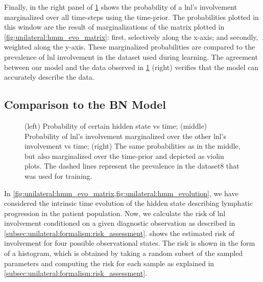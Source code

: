 \documentclass[\relativeRoot/main.tex]{subfiles}
\begin{document}
Finally, in the right panel of \cref{fig:unilateral:hmm_evolution} shows the probability of a \gls{lnl}'s involvement marginalized over all time-steps using the time-prior. The probabilities plotted in this window are the result of marginalizations of the matrix plotted in \cref{fig:unilateral:hmm_evo_matrix}: first, selectively along the x-axis; and secondly, weighted along the y-axis. These marginalized probabilities are compared to the prevalence of \gls{lnl} involvement in the dataset used during learning. The agreement between our model and the data observed in \cref{fig:unilateral:hmm_evolution} (right) verifies that the model can accurately describe the data.

\subsection{Comparison to the BN Model}
\label{subsec:unilateral:application:comp_to_bn}

\begin{figure}
    \centering
    \def\svgwidth{1.01\textwidth}
    
    \caption[Evolution of selected state probabilities]{(left) Probability of certain hidden state vs time; (middle) Probability of \gls{lnl}'s involvement marginalized over the other \gls{lnl}'s involvement vs time; (right) The same probabilities as in the middle, but also marginalized over the time-prior and depicted as violin plots. The dashed lines represent the prevalence in the dataset8 that was used for training.}
    \label{fig:unilateral:hmm_evolution}
\end{figure}

In \cref{fig:unilateral:hmm_evo_matrix,fig:unilateral:hmm_evolution}, we have considered the intrinsic time evolution of the hidden state describing lymphatic progression in the patient population. Now, we calculate the risk of \gls{lnl} involvement conditioned on a given diagnostic observation as described in \cref{subsec:unilateral:formalism:risk_assessment}.  shows the estimated risk of involvement for four possible observational states. The risk is shown in the form of a histogram, which is obtained by taking a random subset of the sampled parameters and computing the risk for each sample as explained in \cref{subsec:unilateral:formalism:risk_assessment}.
\end{document}
